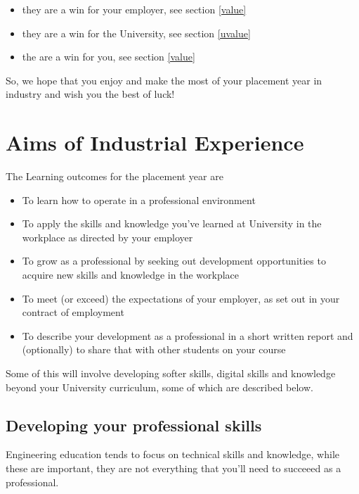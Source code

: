 \documentclass[
]{book}
\providecommand{\tightlist}{%
  \setlength{\itemsep}{0pt}\setlength{\parskip}{0pt}}
\begin{document}
\begin{itemize}
\tightlist
\item
  they are a win for your employer, see section \ref{value}
\item
  they are a win for the University, see section \ref{uvalue}
\item
  the are a win for you, see section \ref{value}
\end{itemize}

So, we hope that you enjoy and make the most of your placement year in industry and wish you the best of luck!

\chapter{Aims of Industrial Experience}\label{aims}

The Learning outcomes for the placement year are

\begin{itemize}
\tightlist
\item
  To learn how to operate in a professional environment
\item
  To apply the skills and knowledge you've learned at University in the workplace as directed by your employer
\item
  To grow as a professional by seeking out development opportunities to acquire new skills and knowledge in the workplace
\item
  To meet (or exceed) the expectations of your employer, as set out in your contract of employment
\item
  To describe your development as a professional in a short written report and (optionally) to share that with other students on your course
\end{itemize}

Some of this will involve developing softer skills, digital skills and knowledge beyond your University curriculum, some of which are described below.

\section{Developing your professional skills}\label{soft}

Engineering education tends to focus on technical skills and knowledge, while these are important, they are not everything that you'll need to succeeed as a professional.
\end{document}
